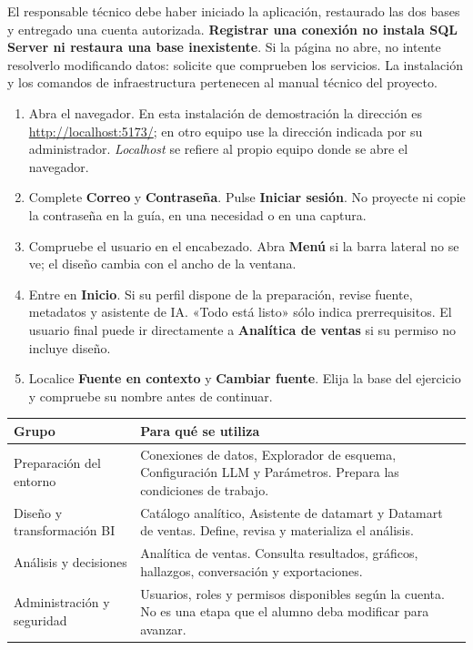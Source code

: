 El responsable técnico debe haber iniciado la aplicación, restaurado las dos bases y entregado una cuenta autorizada. \textbf{Registrar una conexión no instala SQL Server ni restaura una base inexistente}. Si la página no abre, no intente resolverlo modificando datos: solicite que comprueben los servicios. La instalación y los comandos de infraestructura pertenecen al manual técnico del proyecto.
\begin{enumerate}
\item Abra el navegador. En esta instalación de demostración la dirección es \url{http://localhost:5173/}; en otro equipo use la dirección indicada por su administrador. \emph{Localhost} se refiere al propio equipo donde se abre el navegador.
\item Complete \textbf{Correo} y \textbf{Contraseña}. Pulse \textbf{Iniciar sesión}. No proyecte ni copie la contraseña en la guía, en una necesidad o en una captura.
\item Compruebe el usuario en el encabezado. Abra \textbf{Menú} si la barra lateral no se ve; el diseño cambia con el ancho de la ventana.
\item Entre en \textbf{Inicio}. Si su perfil dispone de la preparación, revise fuente, metadatos y asistente de IA. «Todo está listo» sólo indica prerrequisitos. El usuario final puede ir directamente a \textbf{Analítica de ventas} si su permiso no incluye diseño.
\item Localice \textbf{Fuente en contexto} y \textbf{Cambiar fuente}. Elija la base del ejercicio y compruebe su nombre antes de continuar.
\end{enumerate}
\begin{tabularx}{\linewidth}{@{}p{49mm}Y@{}}
\toprule
\textbf{Grupo}&\textbf{Para qué se utiliza}\\
\midrule
Preparación del entorno&Conexiones de datos, Explorador de esquema, Configuración LLM y Parámetros. Prepara las condiciones de trabajo.\\
Diseño y transformación BI&Catálogo analítico, Asistente de datamart y Datamart de ventas. Define, revisa y materializa el análisis.\\
Análisis y decisiones&Analítica de ventas. Consulta resultados, gráficos, hallazgos, conversación y exportaciones.\\
Administración y seguridad&Usuarios, roles y permisos disponibles según la cuenta. No es una etapa que el alumno deba modificar para avanzar.\\
\bottomrule
\end{tabularx}
